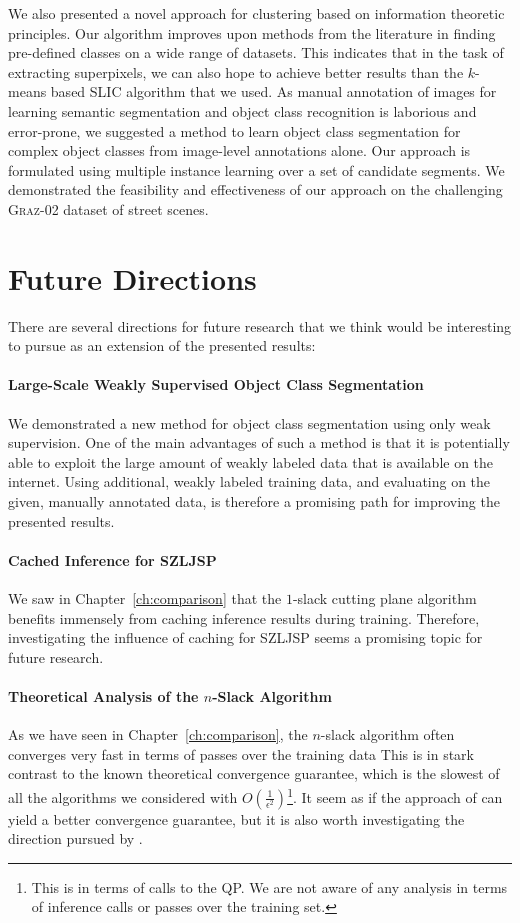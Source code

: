 \documentclass[12pt,toc=bibnumbered, a4paper,twoside,DIV=11,BCOR=1cm]{scrbook}
\begin{document}
We also presented a novel approach for clustering based on information
theoretic principles. Our algorithm improves upon methods from the literature
in finding pre-defined classes on a wide range of datasets. This indicates that
in the task of extracting superpixels, we can also hope to achieve better
results than the $k$-means based SLIC algorithm that we used.
\enlargethispage{1cm}
As manual annotation of images for learning semantic segmentation and object
class recognition is laborious and error-prone, we suggested a method to
learn object class segmentation for complex object classes from image-level
annotations alone. Our approach is formulated using multiple instance learning
over a set of candidate segments. We demonstrated the feasibility and effectiveness
of our approach on the challenging \textsc{Graz}-02 dataset of street scenes.

\section{Future Directions}
There are several directions for future research that we think would be
interesting to pursue as an extension of the presented results:
%
\paragraph{Large-Scale Weakly Supervised Object Class Segmentation}
We demonstrated a new method for object class segmentation using only weak
supervision. One of the main advantages of such a method is that it is
potentially able to exploit the large amount of weakly labeled data that
is available on the internet. Using additional, weakly labeled training data,
and evaluating on the given, manually annotated data, is therefore a promising
path for improving the presented results.
%
\paragraph{Cached Inference for SZLJSP}
We saw in Chapter~\ref{ch:comparison} that the $1$-slack cutting plane algorithm
benefits immensely from caching inference results during training. Therefore, investigating
the influence of caching for SZLJSP seems a promising topic for future research.
%
\paragraph{Theoretical Analysis of the $n$-Slack Algorithm}
As we have seen in Chapter~\ref{ch:comparison}, the $n$-slack algorithm often
converges very fast in terms of passes over the training data This is in stark
contrast to the known theoretical convergence guarantee, which is the slowest
of all the algorithms we considered with
$O(\frac{1}{\epsilon^2})$\footnote{This is in terms of calls to the QP\@. We are
not aware of any analysis in terms of inference calls or passes over the
training set.}. It seem as if the approach of \citet{lacoste2012block} can
yield a better convergence guarantee, but it is also worth investigating the
direction pursued by \citet{shalev2012proximal}.
%
\end{document}
